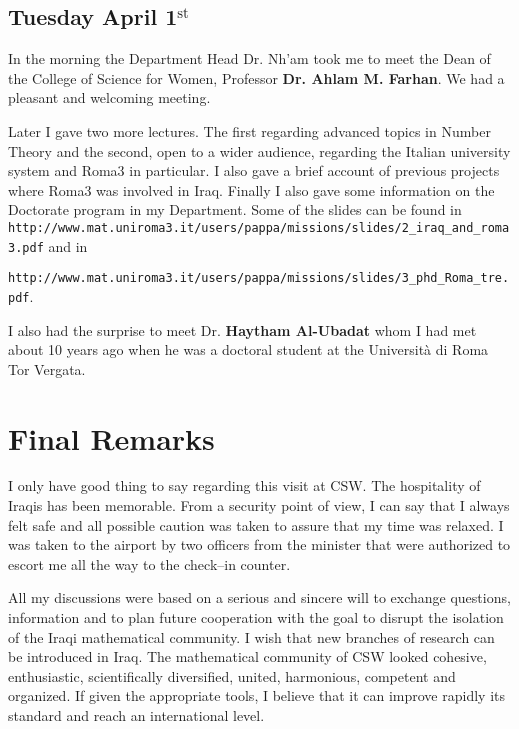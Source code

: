 \documentclass[12pt,a4paper]{scrartcl}
\begin{document}
\subsection{Tuesday April 1$^{\textrm{st}}$}

In the morning the Department Head Dr. Nh'am took me to meet the Dean of the College of Science for Women, Professor \textbf{Dr. Ahlam M. Farhan}.
We had a pleasant and welcoming meeting. 

Later I gave two more lectures. The first regarding advanced topics in Number Theory and the second, open to a wider audience, regarding
the Italian university system and Roma3 in particular. I also gave a brief account of previous projects where Roma3 was involved in Iraq. 
Finally I also gave some information on the Doctorate program in my Department. Some of the slides can be found in  \hfill\\
\texttt{http://www.mat.uniroma3.it/users/pappa/missions/slides/2\_iraq\_and\_roma3.pdf} and in

\noindent \texttt{http://www.mat.uniroma3.it/users/pappa/missions/slides/3\_phd\_Roma\_tre.pdf}.

I also had the surprise to meet Dr. \textbf{Haytham Al-Ubadat} whom I had met about 10 years ago when he was a doctoral student
at the Universit\`a di Roma Tor Vergata.


\section{Final Remarks}

I only have good thing to say regarding this visit at CSW. The hospitality of Iraqis has been memorable. From a security point of view, I can
say that I always felt safe and all possible caution was taken to assure that my time was relaxed. I was taken to the airport by two officers 
from the minister that were authorized to escort me all the way to the check--in counter. 

All my discussions were based on a serious and sincere will to exchange questions, information and to plan future cooperation 
with the goal to disrupt the isolation of the Iraqi mathematical community. 
I wish that new branches of research can be introduced in Iraq. The mathematical community of CSW looked 
cohesive, enthusiastic, scientifically diversified, united, harmonious, competent and organized. If given the appropriate tools, I believe that
it can improve
rapidly its standard and reach an international level. 
\end{document}
